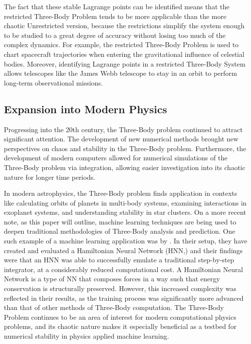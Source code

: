 \documentclass[12pt,a4paper]{article}
\begin{document}
The fact that these stable Lagrange points can be identified means that the restricted Three-Body Problem tends to be more applicable than the more chaotic Unrestricted version, because the restrictions simplify the system enough to be studied to a great degree of accuracy without losing too much of the complex dynamics. For example, the restricted Three-Body Problem is used to chart spacecraft trajectories when entering the gravitational influence of celestial bodies. Moreover, identifying Lagrange points in a restricted Three-Body System allows telescopes like the James Webb telescope \citep{gardner2006james} to stay in an orbit to perform long-term observational missions.

\subsection{Expansion into Modern Physics}
\label{exp_phys}
Progressing into the 20th century, the Three-Body problem continued to attract significant attention. The development of new numerical methods brought new perspectives on chaos and stability in the Three-Body problem. Furthermore, the development of modern computers allowed for numerical simulations of the Three-Body problem via integration, allowing easier investigation into its chaotic nature for longer time periods.

In modern astrophysics, the Three-Body problem finds application in contexts like calculating orbits of planets in multi-body systems, examining interactions in exoplanet systems, and understanding stability in star clusters. On a more recent note, as this paper will outline, machine learning techniques are being used to deepen traditional methodologies of Three-Body analysis and prediction. One such example of a machine learning application was by \cite{ulibarrena2024hybrid}. In their setup, they have created and evaluated a Hamiltonian Neural Network (HNN,) and their findings were that an HNN was able to successfully emulate a traditional step-by-step integrator, at a considerably reduced computational cost. A Hamiltonian Neural Network is a type of NN that composes forces in a way such that energy conservation is structurally preserved. However, this increased complexity was reflected in their results, as the training process was significantly more advanced than that of other methods of Three-Body computation. The Three-Body Problem continues to be an area of interest for modern computational physics problems, and its chaotic nature makes it especially beneficial as a testbed for numerical stability in physics applied machine learning.
\end{document}
